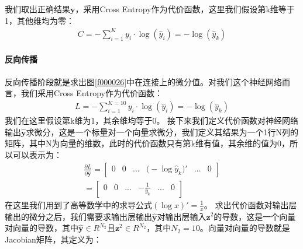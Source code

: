 \documentclass[UTF8]{article}
\begin{document}
我们取出正确结果$\boldsymbol{y}$，采用Cross Entropy作为代价函数，这里我们假设第k维等于1，其他维均为零：
\begin{equation}
\begin{aligned}
C=-\sum_{i=1}^{K}y_i \cdot \log{(\hat{y}_i)}=-\log(\hat{y}_k)
\end{aligned}
\label{mlp-cg-forward-5}
\end{equation}
\paragraph{反向传播}
反向传播阶段就是求出图\ref{f000026}中在连接上的微分值。对我们这个神经网络而言，我们采用Cross Entropy作为代价函数：
\begin{equation}
\begin{aligned}
L=-\sum_{i=1}^{K=10}y_i \cdot \log{(\hat{y}_i)}=-\log{(\hat{y}_k)}
\end{aligned}
\label{mlp-cg-backward-1}
\end{equation}
我们在这里假设第k维为1，其余维均等于0。\newline
接下来我们定义代价函数对神经网络输出$\hat{\boldsymbol{y}}$求微分，这是一个标量对一个向量求微分，我们定义其结果为一个1行N列的矩阵，其中N为向量的维数，此时的代价函数只有第k维有值，其余维的值为0，所以可以表示为：
\begin{equation}
\begin{aligned}
\frac{\partial{L}}{\partial{\hat{\boldsymbol{y}}}}=\begin{bmatrix}
0 & 0 & ... & \big( -\log{\hat{y}_k} \big)' & ... & 0
\end{bmatrix}\\
=\begin{bmatrix}
0 & 0 & ... & -\frac{1}{\hat{y}_k} & ... & 0
\end{bmatrix}
\end{aligned}
\label{mlp-cg-backward-2}
\end{equation}
在这里我们用到了高等数学中的求导公式$(\log x)'=\frac{1}{x}$。
求出代价函数对输出层输出的微分之后，我们需要求输出层输出$\hat{\boldsymbol{y}}$对输出层输入$\boldsymbol{z}^2$的导数，这是一个向量对向量的导数，其中$\hat{\boldsymbol{y}} \in R^{N_2}$且$\boldsymbol{z}^2 \in R^{N_2}$，其中$N_2=10$。向量对向量的导数就是Jacobian矩阵，其定义为：
\end{document}
